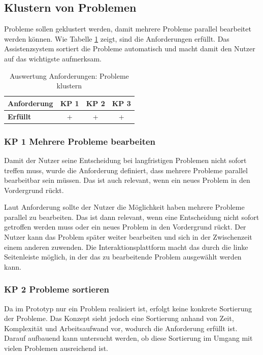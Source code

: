 \subsection{Klustern von Problemen}
Probleme sollen geklustert werden, damit mehrere Probleme parallel bearbeitet werden können. Wie Tabelle \ref{tab:Anforderungen-Probleme} zeigt, sind die Anforderungen erfüllt. Das Assistenzsystem sortiert die Probleme automatisch und macht damit den Nutzer auf das wichtigste aufmerksam.

\begin{table}[htbp]
\caption{Auswertung Anforderungen: Probleme klustern}
\centering
\begin{tabular}{l|c|c|c}
\textbf{Anforderung} & KP 1 & KP 2 & KP 3\\
\hline
\textbf{Erfüllt} & + & + & + \\
\end{tabular}
\label{tab:Anforderungen-Probleme}
\end{table}

\subsubsection*{KP 1 Mehrere Probleme bearbeiten}
Damit der Nutzer seine Entscheidung bei langfristigen Problemen nicht sofort treffen muss, wurde die Anforderung definiert, dass mehrere Probleme parallel bearbeitbar sein müssen. Das ist auch relevant, wenn ein neues Problem in den Vordergrund rückt.

Laut Anforderung  sollte der Nutzer die Möglichkeit haben mehrere Probleme parallel zu bearbeiten. Das ist dann relevant, wenn eine Entscheidung nicht sofort getroffen werden muss oder ein neues Problem in den Vordergrund rückt. Der Nutzer kann das Problem später weiter bearbeiten und sich in der Zwischenzeit einem anderen zuwenden. Die Interaktionsplattform macht das durch die linke Seitenleiste möglich, in der das zu bearbeitende Problem ausgewählt werden kann. 

\subsubsection*{KP 2 Probleme sortieren}
Da im Prototyp nur ein Problem realisiert ist, erfolgt keine konkrete Sortierung der Probleme. Das Konzept sieht jedoch eine Sortierung anhand von Zeit, Komplexität und Arbeitsaufwand vor, wodurch die Anforderung erfüllt ist. Darauf aufbauend kann untersucht werden, ob diese Sortierung im Umgang mit vielen Problemen ausreichend ist.

